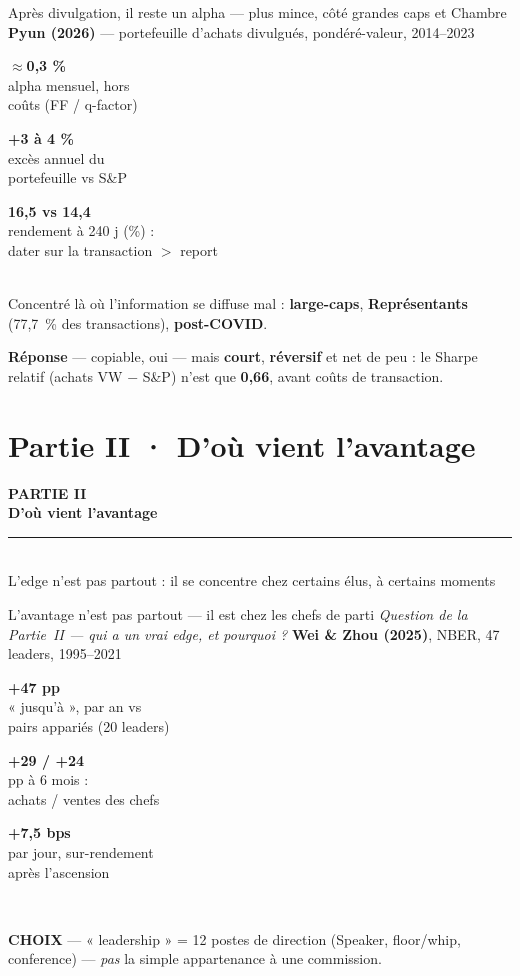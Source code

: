 \documentclass[11pt,aspectratio=169]{beamer}
\newcommand{\co}[1]{\texttt{#1}}
\newcommand{\tuile}[3]{%
  \begin{minipage}[t]{0.23\textwidth}\centering
    \colorbox{#1}{\parbox[c][21mm][c]{\dimexpr\linewidth-8pt}{\centering
      {\color{white}\Large\textbf{#2}}\\[0.6mm]
      {\color{white}\footnotesize #3}}}
  \end{minipage}}
\newcommand{\choixbox}[1]{%
  \colorbox{alertred!8}{\parbox{\dimexpr\linewidth-8pt}{\scriptsize
    \textbf{\textcolor{alertred}{CHOIX}}\; --- #1}}}
\newcommand{\repband}[1]{%
  \colorbox{okgreen!12}{\parbox{\dimexpr\textwidth-10pt}{\scriptsize
    \textbf{\textcolor{okgreen}{Réponse}}\; --- #1}}}
\begin{document}
\begin{frame}{Après divulgation, il reste un alpha --- plus mince, côté grandes caps et Chambre}
  \centering
  {\footnotesize\textbf{Pyun (2026)} --- portefeuille d'achats divulgués, pondéré-valeur, 2014--2023}\\[4mm]
  \tuile{helec}{$\approx$0,3 \%}{alpha mensuel, hors\\coûts (FF / q-factor)}\hfill
  \tuile{okgreen}{+3 à 4 \%}{excès annuel du\\portefeuille vs S\&P}\hfill
  \tuile{grisC}{16,5 vs 14,4}{rendement à 240 j (\%) :\\dater sur la transaction $>$ report}\\[4mm]
  {\footnotesize Concentré là où l'information se diffuse mal : \textbf{large-caps}, \textbf{Représentants}
   (77,7~\% des transactions), \textbf{post-COVID}.}\\[3.5mm]
  \repband{copiable, oui --- mais \textbf{court}, \textbf{réversif} et net de peu : le Sharpe relatif
   (achats VW $-$ S\&P) n'est que \textbf{0,66}, avant coûts de transaction.}
\end{frame}

\section{Partie II · D'où vient l'avantage}

\begin{frame}[plain]
  \centering
  \vspace{12mm}
  {\color{helec!85}\large\textbf{PARTIE II}}\\[3mm]
  {\color{black!88}\fontsize{30}{34}\selectfont\textbf{D'où vient l'avantage}}\\[3mm]
  {\color{helec!45}\rule{0.30\textwidth}{1.2pt}}\\[3mm]
  {\color{black!55}\large L'edge n'est pas partout : il se concentre chez certains élus, à certains moments}
\end{frame}

\begin{frame}{L'avantage n'est pas partout --- il est chez les chefs de parti}
  \centering
  {\footnotesize\textit{Question de la Partie~II --- qui a un vrai edge, et pourquoi ?}\quad
   \textbf{Wei \& Zhou (2025)}, NBER, 47 leaders, 1995--2021}\\[4mm]
  \tuile{helec}{+47 pp}{« jusqu'à », par an vs\\pairs appariés (20 leaders)}\hfill
  \tuile{okgreen}{+29 / +24}{pp à 6 mois :\\achats / ventes des chefs}\hfill
  \tuile{grisC}{+7,5 bps}{par jour, sur-rendement\\après l'ascension}\\[5mm]
  \choixbox{« leadership » = 12 postes de direction (Speaker, floor/whip, conference) ---
   \emph{pas} la simple appartenance à une commission.}
\end{frame}
\end{document}
